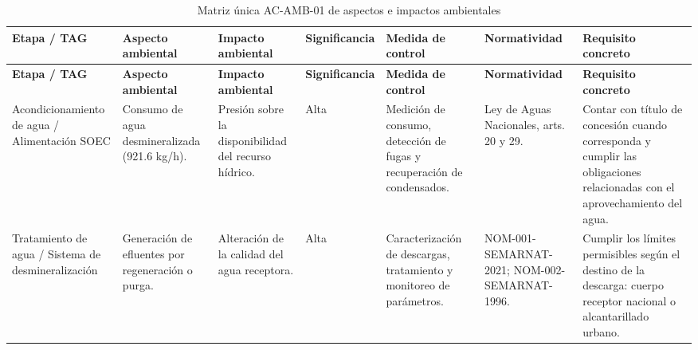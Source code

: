 \documentclass[11pt,letterpaper]{article}
\renewcommand{\arraystretch}{1.21}
\begin{document}
\begin{landscape}

\begin{center}
\scriptsize
\renewcommand{\arraystretch}{1.45}
\setlength{\tabcolsep}{3pt}

\begin{longtable}{
|p{2.7cm}
|p{2.7cm}
|p{3.0cm}
|p{1.5cm}
|p{3.8cm}
|p{3.1cm}
|p{4.2cm}|}

\caption{Matriz única AC-AMB-01 de aspectos e impactos ambientales}
\label{tab:matriz_ambiental}\\

\hline
\rowcolor{verdeoscuro}
\color{white}\textbf{Etapa / TAG} &
\color{white}\textbf{Aspecto ambiental} &
\color{white}\textbf{Impacto ambiental} &
\color{white}\textbf{Significancia} &
\color{white}\textbf{Medida de control} &
\color{white}\textbf{Normatividad} &
\color{white}\textbf{Requisito concreto}\\
\hline
\endfirsthead

\hline
\rowcolor{verdeoscuro}
\color{white}\textbf{Etapa / TAG} &
\color{white}\textbf{Aspecto ambiental} &
\color{white}\textbf{Impacto ambiental} &
\color{white}\textbf{Significancia} &
\color{white}\textbf{Medida de control} &
\color{white}\textbf{Normatividad} &
\color{white}\textbf{Requisito concreto}\\
\hline
\endhead


Acondicionamiento de agua /
Alimentación SOEC
&
Consumo de agua desmineralizada
(921.6 kg/h).
&
Presión sobre la disponibilidad
del recurso hídrico.
&
\cellcolor{rojoclaro}Alta
&
Medición de consumo, detección
de fugas y recuperación de
condensados.
&
Ley de Aguas Nacionales,
arts. 20 y 29.
&
Contar con título de concesión
cuando corresponda y cumplir
las obligaciones relacionadas
con el aprovechamiento del agua.
\\
\hline

Tratamiento de agua /
Sistema de desmineralización
&
Generación de efluentes
por regeneración o purga.
&
Alteración de la calidad
del agua receptora.
&
\cellcolor{rojoclaro}Alta
&
Caracterización de descargas,
tratamiento y monitoreo
de parámetros.
&
NOM-001-SEMARNAT-2021;
NOM-002-SEMARNAT-1996.
&
Cumplir los límites permisibles
según el destino de la descarga:
cuerpo receptor nacional
o alcantarillado urbano.
\\
\hline


\end{longtable}
\end{center}
\end{landscape}
\end{document}
